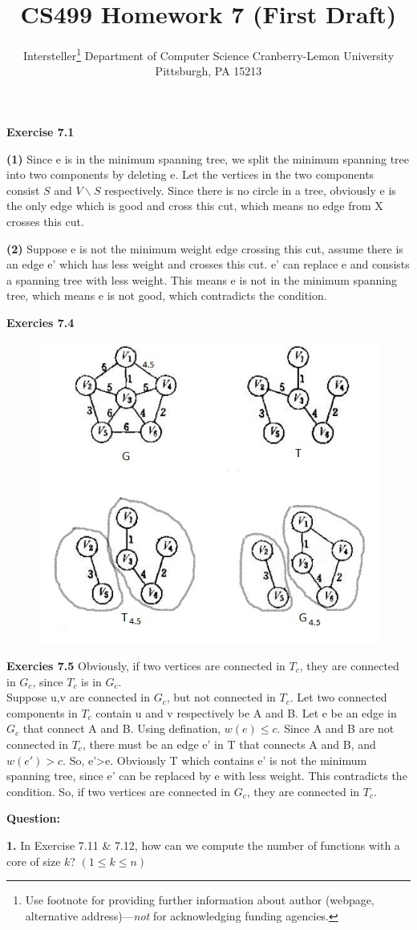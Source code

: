 \documentclass{article} %
\title{CS499 Homework 7 (First Draft)}
\author{
	Intersteller\thanks{ Use footnote for providing further information
		about author (webpage, alternative address)---\emph{not} for acknowledging
		funding agencies.}
	Department of Computer Science
	Cranberry-Lemon University
	Pittsburgh, PA 15213
}
\begin{document}
	\maketitle
	\textbf{Exercise 7.1}\par
	\textbf{(1)}  Since e is in the minimum spanning tree, we split the minimum spanning tree into two components by deleting e. Let the vertices in the two components consist $S$ and $V\backslash S$ respectively. Since there is no circle in a tree, obviously e is the only edge which is good and cross this cut, which means no edge from X crosses this cut. \par
	\textbf{(2)}  Suppose e is not the minimum weight edge crossing this cut, assume there is an edge e' which has less weight and crosses this cut. e' can replace e and consists a spanning tree with less weight. This means e is not in the minimum spanning tree, which means e is not good, which contradicts the condition.\par
	\textbf{Exercies 7.4}
	\begin{figure}[H]
		\centering
		\includegraphics[scale=0.6]{P1.png}
		\caption{}
		\label{fig:1}
	\end{figure}

	\textbf{Exercies 7.5}
	Obviously, if two vertices are connected in $T_c$, they are connected in $G_c$, since $T_c$ is in $G_c$.\\
	Suppose u,v are connected in $G_c$, but not connected in $T_c$. Let two connected components in $T_c$ contain u and v respectively be A and B. Let e be an edge in $G_c$ that connect A and B. Using defination, $w(e)\leq c$. Since A and B are not connected in $T_c$, there must be an edge e' in T that connects A and B, and $w(e')>c$. So, e'>e. Obviously T which contains e' is not the minimum spanning tree, since e' can be replaced by e with less weight. This contradicts the condition. So, if two vertices are connected in $G_c$, they are connected in $T_c$.\par 
    
	\textbf{Question:}\par
	\textbf{1.}  In Exercise 7.11 \& 7.12, how can we compute the number of functions with a core of size $k$? $(1\leq k\leq n)$
\end{document}
